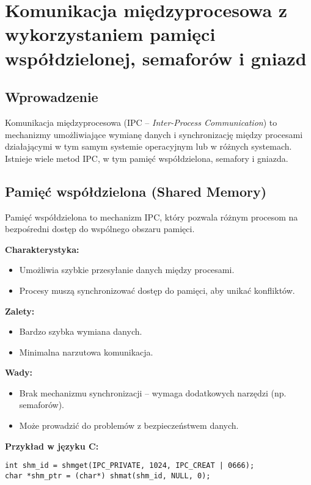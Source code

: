 \section{Komunikacja międzyprocesowa z wykorzystaniem pamięci współdzielonej, semaforów i gniazd}

\subsection{Wprowadzenie}
Komunikacja międzyprocesowa (IPC – \textit{Inter-Process Communication}) to mechanizmy umożliwiające wymianę danych i synchronizację między procesami działającymi w tym samym systemie operacyjnym lub w różnych systemach. Istnieje wiele metod IPC, w tym pamięć współdzielona, semafory i gniazda.

\subsection{Pamięć współdzielona (Shared Memory)}
Pamięć współdzielona to mechanizm IPC, który pozwala różnym procesom na bezpośredni dostęp do wspólnego obszaru pamięci.

\textbf{Charakterystyka:}
\begin{itemize}
    \item Umożliwia szybkie przesyłanie danych między procesami.
    \item Procesy muszą synchronizować dostęp do pamięci, aby unikać konfliktów.
\end{itemize}

\textbf{Zalety:}
\begin{itemize}
    \item Bardzo szybka wymiana danych.
    \item Minimalna narzutowa komunikacja.
\end{itemize}

\textbf{Wady:}
\begin{itemize}
    \item Brak mechanizmu synchronizacji – wymaga dodatkowych narzędzi (np. semaforów).
    \item Może prowadzić do problemów z bezpieczeństwem danych.
\end{itemize}

\textbf{Przykład w języku C:}
\begin{verbatim}
int shm_id = shmget(IPC_PRIVATE, 1024, IPC_CREAT | 0666);
char *shm_ptr = (char*) shmat(shm_id, NULL, 0);
\end{verbatim}

